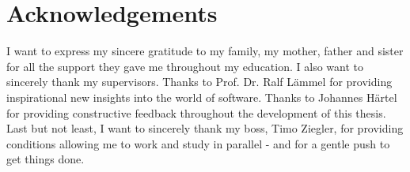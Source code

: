 \chapter*{Acknowledgements}
I want to express my sincere gratitude to my family, my mother, father and sister for all the support they gave me throughout my education.
\newline
\vspace*{.1in}
\newline
\noindent
I also want to sincerely thank my supervisors.
Thanks to Prof. Dr. Ralf Lämmel for providing inspirational new insights into the world of software.
Thanks to Johannes Härtel for providing constructive feedback throughout the development of this thesis.
\newline
\vspace*{.1in}
\newline
\noindent
Last but not least, I want to sincerely thank my boss, Timo Ziegler, for providing conditions allowing me to work and study in parallel - and for a gentle push to get things done.
